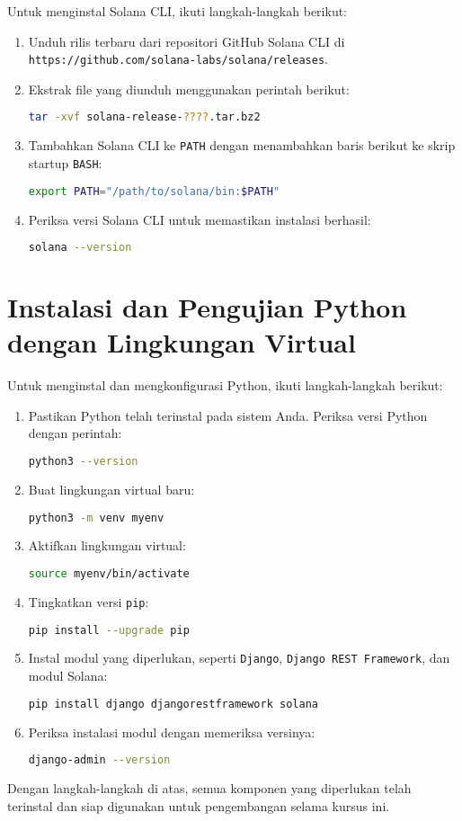 Untuk menginstal Solana CLI, ikuti langkah-langkah berikut:
\begin{enumerate}
\item Unduh rilis terbaru dari repositori GitHub Solana CLI di \texttt{https://github.com/solana-labs/solana/releases}.
\item Ekstrak file yang diunduh menggunakan perintah berikut:
\begin{lstlisting}[language=bash]
tar -xvf solana-release-????.tar.bz2
\end{lstlisting}
\item Tambahkan Solana CLI ke \texttt{PATH} dengan menambahkan baris berikut ke skrip startup \texttt{BASH}:
\begin{lstlisting}[language=bash]
export PATH="/path/to/solana/bin:$PATH"
\end{lstlisting}
\item Periksa versi Solana CLI untuk memastikan instalasi berhasil:
\begin{lstlisting}[language=bash]
solana --version
\end{lstlisting}
\end{enumerate}



\section{Instalasi dan Pengujian Python dengan Lingkungan Virtual}

Untuk menginstal dan mengkonfigurasi Python, ikuti langkah-langkah berikut:
\begin{enumerate}
\item Pastikan Python telah terinstal pada sistem Anda. Periksa versi Python dengan perintah:
\begin{lstlisting}[language=bash]
python3 --version
\end{lstlisting}
\item Buat lingkungan virtual baru:
\begin{lstlisting}[language=bash]
python3 -m venv myenv
\end{lstlisting}
\item Aktifkan lingkungan virtual:
\begin{lstlisting}[language=bash]
source myenv/bin/activate
\end{lstlisting}
\item Tingkatkan versi \texttt{pip}:
\begin{lstlisting}[language=bash]
pip install --upgrade pip
\end{lstlisting}
\item Instal modul yang diperlukan, seperti \texttt{Django}, \texttt{Django REST Framework}, dan modul Solana:
\begin{lstlisting}[language=bash]
pip install django djangorestframework solana
\end{lstlisting}
\item Periksa instalasi modul dengan memeriksa versinya:
\begin{lstlisting}[language=bash]
django-admin --version
\end{lstlisting}
\end{enumerate}

Dengan langkah-langkah di atas, semua komponen yang diperlukan telah terinstal dan siap digunakan untuk pengembangan selama kursus ini.





